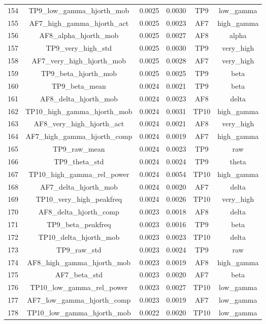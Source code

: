 \begin{table}[hptb]
\begin{table}
\begin{tabular}{cccccc}
154 & TP9_low_gamma_hjorth_mob & 0.0025 & 0.0030 & TP9 & low_gamma \\
155 & AF7_high_gamma_hjorth_act & 0.0025 & 0.0023 & AF7 & high_gamma \\
156 & AF8_alpha_hjorth_mob & 0.0025 & 0.0027 & AF8 & alpha \\
157 & TP9_very_high_std & 0.0025 & 0.0030 & TP9 & very_high \\
158 & AF7_very_high_hjorth_mob & 0.0025 & 0.0028 & AF7 & very_high \\
159 & TP9_beta_hjorth_mob & 0.0025 & 0.0025 & TP9 & beta \\
160 & TP9_beta_mean & 0.0024 & 0.0021 & TP9 & beta \\
161 & AF8_delta_hjorth_mob & 0.0024 & 0.0023 & AF8 & delta \\
162 & TP10_high_gamma_hjorth_mob & 0.0024 & 0.0031 & TP10 & high_gamma \\
163 & AF8_very_high_hjorth_act & 0.0024 & 0.0021 & AF8 & very_high \\
164 & AF7_high_gamma_hjorth_comp & 0.0024 & 0.0019 & AF7 & high_gamma \\
165 & TP9_raw_mean & 0.0024 & 0.0023 & TP9 & raw \\
166 & TP9_theta_std & 0.0024 & 0.0024 & TP9 & theta \\
167 & TP10_high_gamma_rel_power & 0.0024 & 0.0054 & TP10 & high_gamma \\
168 & AF7_delta_hjorth_mob & 0.0024 & 0.0020 & AF7 & delta \\
169 & TP10_very_high_peakfreq & 0.0024 & 0.0026 & TP10 & very_high \\
170 & AF8_delta_hjorth_comp & 0.0023 & 0.0018 & AF8 & delta \\
171 & TP9_beta_peakfreq & 0.0023 & 0.0016 & TP9 & beta \\
172 & TP10_delta_hjorth_mob & 0.0023 & 0.0023 & TP10 & delta \\
173 & TP9_raw_std & 0.0023 & 0.0024 & TP9 & raw \\
174 & AF8_high_gamma_hjorth_mob & 0.0023 & 0.0019 & AF8 & high_gamma \\
175 & AF7_beta_std & 0.0023 & 0.0020 & AF7 & beta \\
176 & TP10_low_gamma_rel_power & 0.0023 & 0.0027 & TP10 & low_gamma \\
177 & AF7_low_gamma_hjorth_comp & 0.0023 & 0.0019 & AF7 & low_gamma \\
178 & TP10_low_gamma_hjorth_mob & 0.0022 & 0.0020 & TP10 & low_gamma \\

\end{tabular}
\end{table}
\end{table}
